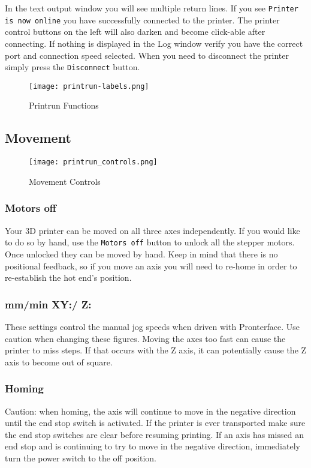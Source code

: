 In the text output window you will see multiple return lines. If you see \texttt{Printer is now online} you have successfully connected to the printer. The printer control buttons on the left will also darken and become click-able after connecting. If nothing is displayed in the Log window verify you have the correct port and connection speed selected. When you need to disconnect the printer simply press the \texttt{Disconnect} button.

\begin{figure}[H]
\centering
\texttt{[image: printrun-labels.png]}
\caption{Printrun Functions}
\label{fig:Printrun-labels}
\end{figure}

\subsection{Movement}
\begin{figure}[H]
\centering
\texttt{[image: printrun\_controls.png]}
\caption{Movement Controls}
\label{fig:Printrun_controls}
\end{figure}

\subsubsection{Motors off}
Your 3D printer can be moved on all three axes independently. If you would like to do so by hand, use the \texttt{Motors off} button to unlock all the stepper motors. Once unlocked they can be moved by hand. Keep in mind that there is no positional feedback, so if you move an axis you will need to re-home in order to re-establish the hot end's position.

\subsubsection{mm/min XY:/ Z:}
These settings control the manual jog speeds when driven with Pronterface. Use caution when changing these figures. Moving the axes too fast can cause the printer to miss steps. If that occurs with the Z axis, it can potentially cause the Z axis to become out of square.

\subsubsection{Homing}
Caution: when homing, the axis will continue to move in the negative direction until the end stop switch is activated. If the printer is ever transported make sure the end stop switches are clear before resuming printing. If an axis has missed an end stop and is continuing to try to move in the negative direction, immediately turn the power switch to the off position.

